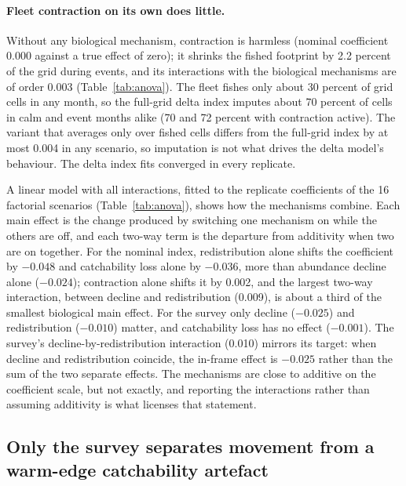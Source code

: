 \documentclass[11pt,a4paper]{article}
\begin{document}
\paragraph{Fleet contraction on its own does little.} Without any biological mechanism, contraction is harmless (nominal coefficient 0.000 against a true effect of zero); it shrinks the fished footprint by 2.2 percent of the grid during events, and its interactions with the biological mechanisms are of order 0.003 (Table~\ref{tab:anova}). The fleet fishes only about 30 percent of grid cells in any month, so the full-grid delta index imputes about 70 percent of cells in calm and event months alike (70 and 72 percent with contraction active). The variant that averages only over fished cells differs from the full-grid index by at most 0.004 in any scenario, so imputation is not what drives the delta model's behaviour. The delta index fits converged in every replicate.

A linear model with all interactions, fitted to the replicate coefficients of the 16 factorial scenarios (Table~\ref{tab:anova}), shows how the mechanisms combine. Each main effect is the change produced by switching one mechanism on while the others are off, and each two-way term is the departure from additivity when two are on together. For the nominal index, redistribution alone shifts the coefficient by $-0.048$ and catchability loss alone by $-0.036$, more than abundance decline alone ($-0.024$); contraction alone shifts it by 0.002, and the largest two-way interaction, between decline and redistribution (0.009), is about a third of the smallest biological main effect. For the survey only decline ($-0.025$) and redistribution ($-0.010$) matter, and catchability loss has no effect ($-0.001$). The survey's decline-by-redistribution interaction (0.010) mirrors its target: when decline and redistribution coincide, the in-frame effect is $-0.025$ rather than the sum of the two separate effects. The mechanisms are close to additive on the coefficient scale, but not exactly, and reporting the interactions rather than assuming additivity is what licenses that statement.

\subsection{Only the survey separates movement from a warm-edge catchability artefact}
\label{sec:res-cog}
\end{document}

